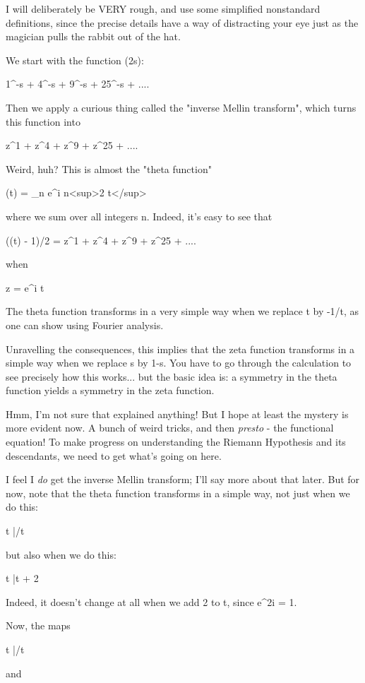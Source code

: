 I will deliberately be VERY rough, and use some simplified nonstandard
definitions, since the precise details have a way of distracting your 
eye just as the magician pulls the rabbit out of the hat.

We start with the function \zeta (2s):

1^{-s} + 4^{-s} + 9^{-s} + 25^{-s} + ....

Then we apply a curious thing called the "inverse
Mellin transform", which turns 
this function into 

z^{1}  + z^{4}  + z^{9}  + z^{25} + ....

Weird, huh?  This is almost the "theta function"

\theta (t) = \sum_{n} e^{\pi  i n<sup>2} t</sup>

where we sum over all integers n.  Indeed, it's easy to see that

(\theta (t) - 1)/2 = z^{1} + z^{4} + z^{9} + 
z^{25} + .... 

when 

z = e^{\pi  i t}

The theta function transforms in a very simple way when we replace
t by -1/t, as one can show using Fourier analysis.

Unravelling the consequences, this implies that the zeta function 
transforms in a simple way when we replace s by 1-s.  You have to
go through the calculation to see precisely how this works... but 
the basic idea is: a symmetry in the theta function yields a symmetry
in the zeta function.

Hmm, I'm not sure that explained anything!  But I hope at least the 
mystery is more evident now.  A bunch of weird tricks, and then 
\emph{presto} - 
the functional equation!  To make progress on understanding the Riemann 
Hypothesis and its descendants, we need to get what's going on here.  

I feel I \emph{do} get the inverse
Mellin transform; I'll say more about that later.  
But for now, note that the theta function transforms in a simple way, not 
just when we do this:
 
t |/t

but also when we do this:

t |\to  t + 2

Indeed, it doesn't change at all when we add 2 to t, since e^{2\pi  i} = 1.   

Now, the maps

t |/t

and 

